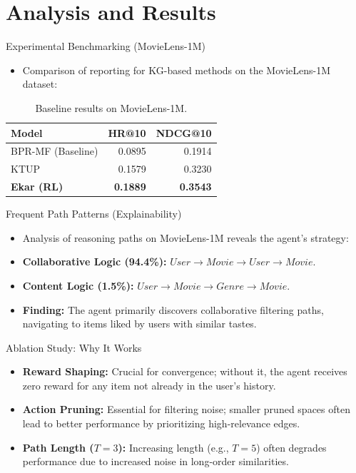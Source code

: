 \documentclass[10pt]{beamer}
\begin{document}
\section{Analysis and Results}

\begin{frame}{Experimental Benchmarking (MovieLens-1M)}
    \begin{itemize}
        \item Comparison of reporting for KG-based methods on the MovieLens-1M dataset:
    \end{itemize}
    \begin{table}
        \centering
        \begin{tabular}{lrr}
            \toprule
            \textbf{Model} & \textbf{HR@10} & \textbf{NDCG@10} \\
            \midrule
            BPR-MF (Baseline) & 0.0895 & 0.1914 \\
            KTUP & 0.1579 & 0.3230 \\
            \textbf{Ekar (RL)} & \textbf{0.1889} & \textbf{0.3543} \\
            \bottomrule
        \end{tabular}
        \caption{Baseline results on MovieLens-1M.}
    \end{table}
\end{frame}

\begin{frame}{Frequent Path Patterns (Explainability)}
    \begin{itemize}
        \item Analysis of reasoning paths on MovieLens-1M reveals the agent's strategy:
        \item \textbf{Collaborative Logic (94.4\%):} $User \to Movie \to User \to Movie$.
        \item \textbf{Content Logic (1.5\%):} $User \to Movie \to Genre \to Movie$.
        \item \textbf{Finding:} The agent primarily discovers collaborative filtering paths, navigating to items liked by users with similar tastes.
    \end{itemize}
\end{frame}

\begin{frame}{Ablation Study: Why It Works}
    \begin{itemize}
        \item \textbf{Reward Shaping:} Crucial for convergence; without it, the agent receives zero reward for any item not already in the user's history.
        \item \textbf{Action Pruning:} Essential for filtering noise; smaller pruned spaces often lead to better performance by prioritizing high-relevance edges.
        \item \textbf{Path Length ($T=3$):} Increasing length (e.g., $T=5$) often degrades performance due to increased noise in long-order similarities.
    \end{itemize}
\end{frame}
\end{document}
